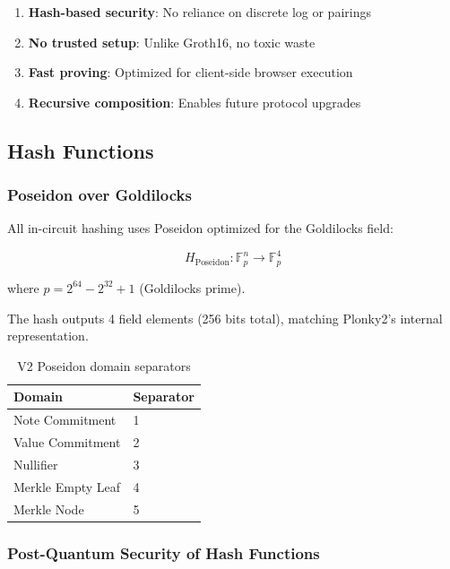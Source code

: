 \documentclass[11pt,a4paper]{article}
\begin{document}
\begin{enumerate}
    \item \textbf{Hash-based security}: No reliance on discrete log or pairings
    \item \textbf{No trusted setup}: Unlike Groth16, no toxic waste
    \item \textbf{Fast proving}: Optimized for client-side browser execution
    \item \textbf{Recursive composition}: Enables future protocol upgrades
\end{enumerate}

\subsection{Hash Functions}

\subsubsection{Poseidon over Goldilocks}

All in-circuit hashing uses Poseidon optimized for the Goldilocks field:

\begin{equation}
H_{\text{Poseidon}}: \mathbb{F}_p^n \rightarrow \mathbb{F}_p^4
\end{equation}

where $p = 2^{64} - 2^{32} + 1$ (Goldilocks prime).

The hash outputs 4 field elements (256 bits total), matching Plonky2's internal representation.

\begin{table}[h]
\centering
\begin{tabular}{ll}
\toprule
Domain & Separator \\
\midrule
Note Commitment & 1 \\
Value Commitment & 2 \\
Nullifier & 3 \\
Merkle Empty Leaf & 4 \\
Merkle Node & 5 \\
\bottomrule
\end{tabular}
\caption{V2 Poseidon domain separators}
\end{table}

\subsubsection{Post-Quantum Security of Hash Functions}
\end{document}
